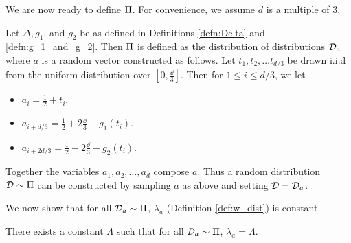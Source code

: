 We are now ready to define $\Pi$. For convenience, we assume $d$ is a multiple of $3$.
\begin{defn}\label{defn:A}
Let $\Delta, g_1$, and $g_2$ be as defined in Definitions \ref{defn:Delta} and \ref{defn:g_1_and_g_2}. Then $\Pi$ is defined as the distribution of distributions ${\mathcal D}_a$ where $a$ is a random vector constructed as follows. Let $t_1, t_2, \dots t_{d/3}$ be drawn i.i.d from the uniform distribution over $[0, \frac{\dd}{3}]$. Then for $1 \leq i \leq d/3$, we let
	\begin{itemize}
		\item $a_i = \frac{1}{2} + t_i$.
		\item $a_{i+d/3} = \frac{1}{2} + 2\frac{\dd}{3} - g_1(t_i)$.
		\item $a_{i + 2d/3} = \frac{1}{2} - 2\frac{\dd}{3} - g_2(t_i).$
	\end{itemize}
Together the variables $a_1, a_2, \dots, a_d$ compose $a$. Thus a random distribution ${\mathcal D} \sim \Pi$ can be constructed by sampling $a$ as above and setting ${\mathcal D} = {\mathcal D}_a$.
\end{defn}

We now show that for all ${\mathcal D}_a \sim \Pi$, $\lambda_a$ (Definition \ref{def:w_dist}) is constant.

\begin{lem}\label{lem:cons_lambda}
There exists a constant $\Lambda$ such that for all ${\mathcal D}_a \sim \Pi$, $\lambda_a = \Lambda$. 
\end{lem}

